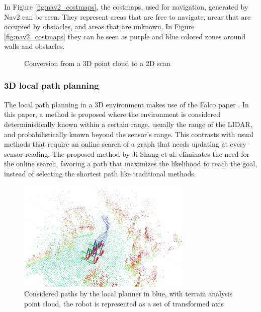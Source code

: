 \documentclass[12pt]{article}
\begin{document}
        In Figure \ref{fig:nav2_costmaps}, the costmaps, used for navigation, generated by Nav2 can be seen. They represent areas that are free to navigate, areas that are occupied by obstacles, and areas that are unknown. In Figure \ref{fig:nav2_costmaps} they can be seen as purple and blue colored zones around walls and obstacles.  

        \begin{figure}[h]
            \centering
            \resizebox{0.75\textwidth}{!}{%
            
            }   
            \caption{Conversion from a 3D point cloud to a 2D scan}
            \label{fig:pointcloud_to_laserscan}
        \end{figure}
        
        
        \subsubsection{3D local path planning}
        \label{section:local_path_planning}

        The local path planning in a 3D environment makes use of the Falco paper \cite{zhang2020falco}. In this paper, a method is proposed where the environment is considered deterministically known within a certain range, usually the range of the LIDAR, and probabilistically known beyond the sensor's range. This contrasts with usual methods that require an online search of a graph that needs updating at every sensor reading. The proposed method by Ji Shang et al. eliminates the need for the online search, favoring a path that maximizes the likelihood to reach the goal, instead of selecting the shortest path like traditional methods.

        \begin{figure}[H]
            \centering
            \includegraphics[width=0.75\textwidth]{Images/free_paths.png}
            \caption{Considered paths by the local planner in blue, with terrain analysis point cloud, the robot is represented as a set of transformed axis}
            \label{fig:local_planner_paths}
        \end{figure}
\end{document}
